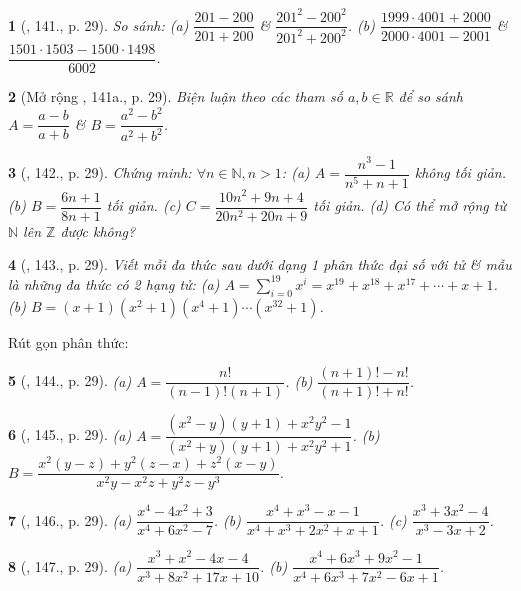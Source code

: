 \documentclass{article}
\newtheorem{baitoan}{}
\begin{document}
\begin{baitoan}[\cite{Tuyen_Toan_8}, 141., p. 29]
	So sánh: (a) $\dfrac{201 - 200}{201 + 200}$ \& $\dfrac{201^2 - 200^2}{201^2 + 200^2}$. (b) $\dfrac{1999\cdot 4001 + 2000}{2000\cdot 4001 - 2001}$ \& $\dfrac{1501\cdot 1503 - 1500\cdot 1498}{6002}$.
\end{baitoan}

\begin{baitoan}[Mở rộng \cite{Tuyen_Toan_8}, 141a., p. 29]
	Biện luận theo các tham số $a,b\in\mathbb{R}$ để so sánh $A = \dfrac{a - b}{a + b}$ \& $B = \dfrac{a^2 - b^2}{a^2 + b^2}$.
\end{baitoan}

\begin{baitoan}[\cite{Tuyen_Toan_8}, 142., p. 29]
	Chứng minh: $\forall n\in\mathbb{N},n > 1$: (a) $A = \dfrac{n^3 - 1}{n^5 + n + 1}$ không tối giản. (b) $B = \dfrac{6n + 1}{8n + 1}$ tối giản. (c) $C = \dfrac{10n^2 + 9n + 4}{20n^2 + 20n + 9}$ tối giản. (d) Có thể mở rộng từ $\mathbb{N}$ lên $\mathbb{Z}$ được không?
\end{baitoan}

\begin{baitoan}[\cite{Tuyen_Toan_8}, 143., p. 29]
	Viết mỗi đa thức sau dưới dạng 1 phân thức đại số với tử \& mẫu là những đa thức có 2 hạng tử: (a) $A = \sum_{i=0}^{19} x^i = x^{19} + x^{18} + x^{17} + \cdots + x + 1$. (b) $B = (x + 1)(x^2 + 1)(x^4 + 1)\cdots(x^{32} + 1)$.	
\end{baitoan}
Rút gọn phân thức:

\begin{baitoan}[\cite{Tuyen_Toan_8}, 144., p. 29]
	(a) $A = \dfrac{n!}{(n - 1)!(n + 1)}$. (b) $\dfrac{(n + 1)! - n!}{(n + 1)! + n!}$.	
\end{baitoan}

\begin{baitoan}[\cite{Tuyen_Toan_8}, 145., p. 29]
	(a) $A = \dfrac{(x^2 - y)(y + 1) + x^2y^2 - 1}{(x^2 + y)(y + 1) + x^2y^2 + 1}$. (b) $B = \dfrac{x^2(y - z) + y^2(z - x) + z^2(x - y)}{x^2y - x^2z + y^2z - y^3}$.	
\end{baitoan}

\begin{baitoan}[\cite{Tuyen_Toan_8}, 146., p. 29]
	(a) $\dfrac{x^4 - 4x^2 + 3}{x^4 + 6x^2 - 7}$. (b) $\dfrac{x^4 + x^3 - x - 1}{x^4 + x^3 + 2x^2 + x + 1}$. (c) $\dfrac{x^3 + 3x^2 - 4}{x^3 - 3x + 2}$.	
\end{baitoan}

\begin{baitoan}[\cite{Tuyen_Toan_8}, 147., p. 29]
	(a) $\dfrac{x^3 + x^2 - 4x - 4}{x^3 + 8x^2 + 17x + 10}$. (b) $\dfrac{x^4 + 6x^3 + 9x^2 - 1}{x^4 + 6x^3 + 7x^2 - 6x + 1}$.	
\end{baitoan}
\end{document}
